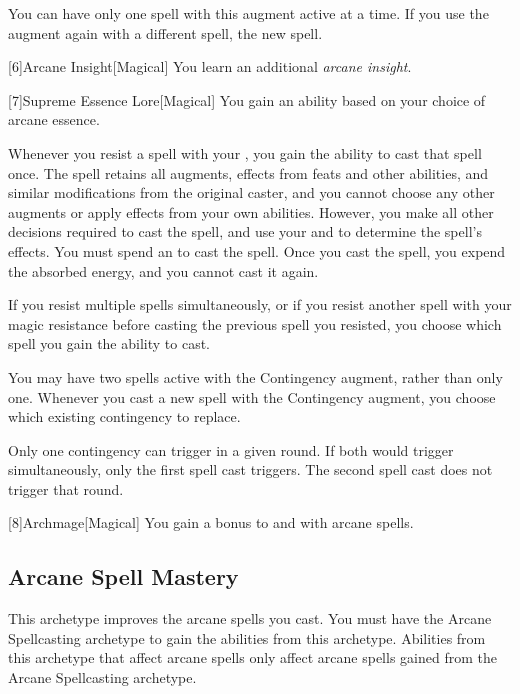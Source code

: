         You can have only one spell with this augment active at a time.
        If you use the augment again with a different spell, the new spell.

        [6]{Arcane Insight}[Magical]
        You learn an additional \textit{arcane insight}.

        [7]{Supreme Essence Lore}[Magical]
        You gain an ability based on your choice of arcane essence.

         Whenever you resist a spell with your , you gain the ability to cast that spell once.
        The spell retains all augments, effects from feats and other abilities, and similar modifications from the original caster, and you cannot choose any other augments or apply effects from your own abilities.
        However, you make all other decisions required to cast the spell, and use your  and  to determine the spell's effects.
        You must spend an  to cast the spell.
        Once you cast the spell, you expend the absorbed energy, and you cannot cast it again.

        If you resist multiple spells simultaneously, or if you resist another spell with your magic resistance before casting the previous spell you resisted, you choose which spell you gain the ability to cast.

         You may have two spells active with the Contingency augment, rather than only one.
        Whenever you cast a new spell with the Contingency augment, you choose which existing contingency to replace.

        Only one contingency can trigger in a given round.
        If both would trigger simultaneously, only the first spell cast triggers.
        The second spell cast does not trigger that round.

        [8]{Archmage}[Magical]
        You gain a  bonus to  and  with arcane spells.

    \subsection{Arcane Spell Mastery}
        This archetype improves the arcane spells you cast.
        You must have the Arcane Spellcasting archetype to gain the abilities from this archetype.
        Abilities from this archetype that affect arcane spells only affect arcane spells gained from the Arcane Spellcasting archetype.

